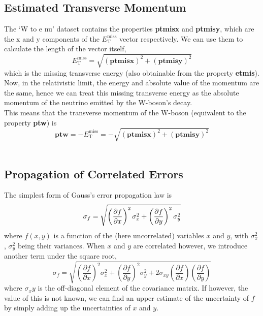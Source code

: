 \subsection{Estimated Transverse Momentum}

\noindent The `W to e nu' dataset contains the properties \textbf{ptmisx} and \textbf{ptmisy}, which are the x and y components of the $E^{\text{miss}}_{\text{T}}$ vector respectively. We can use them to calculate the length of the vector itself,
$$E^{\text{miss}}_{\text{T}} = \sqrt{(\textbf{ptmisx})^2 + (\textbf{ptmisy})^2}$$
which is the missing transverse energy (also obtainable from the property \textbf{etmis}). Now, in the relativistic limit, the energy and absolute value of the momentum are the same, hence we can treat this missing transverse energy as the absolute momentum of the neutrino emitted by the W-boson's decay.\\

\noindent This means that the transverse momentum of the W-boson (equivalent to the property \textbf{ptw}) is
$$\textbf{ptw} = -E^{\text{miss}}_{\text{T}} = -\sqrt{(\textbf{ptmisx})^2 + (\textbf{ptmisy})^2}$$\\

\subsection{Propagation of Correlated Errors}

\noindent The simplest form of Gauss's error propagation law is
\begin{equation}{\label{gausserr}}
    \sigma_f = \sqrt{ \left(\frac{\partial f}{\partial x}\right)^2 \sigma_x^2 + \left(\frac{\partial f}{\partial y}\right)^2 \sigma_y^2 }
\end{equation}
where $f(x,y)$ is a function of the (here uncorrelated) variables $x$ and $y$, with $\sigma_x^2$, $\sigma_y^2$ being their variances. When $x$ and $y$ are correlated however, we introduce another term under the square root,
$$\sigma_f = \sqrt{ \left(\frac{\partial f}{\partial x}\right)^2 \sigma_x^2 + \left(\frac{\partial f}{\partial y}\right)^2 \sigma_y^2 + 2\sigma_{xy} \left(\frac{\partial f}{\partial x}\right) \left(\frac{\partial f}{\partial y}\right)}$$
where $\sigma_xy$ is the off-diagonal element of the covariance matrix. If however, the value of this is not known, we can find an upper estimate of the uncertainty of $f$ by simply adding up the uncertainties of $x$ and $y$.\\